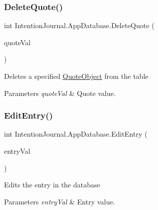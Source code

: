 \subsubsection{\texorpdfstring{Delete\+Quote()}{DeleteQuote()}}
{\footnotesize\ttfamily int Intention\+Journal.\+App\+Database.\+Delete\+Quote (\begin{DoxyParamCaption}\item[{\hyperlink{class_intention_journal_1_1_quote_object}{Quote\+Object}}]{quote\+Val }\end{DoxyParamCaption})\hspace{0.3cm}{\ttfamily [inline]}}



Deletes a specified \hyperlink{class_intention_journal_1_1_quote_object}{Quote\+Object} from the table 


\begin{DoxyParams}{Parameters}
{\em quote\+Val} & Quote value.\\
\hline
\end{DoxyParams}
\mbox{\label{class_intention_journal_1_1_app_database_a07232a4f14f877fc9e46cf57aad2bfae}} 
\subsubsection{\texorpdfstring{Edit\+Entry()}{EditEntry()}}
{\footnotesize\ttfamily int Intention\+Journal.\+App\+Database.\+Edit\+Entry (\begin{DoxyParamCaption}\item[{\hyperlink{class_intention_journal_1_1_entry_object}{Entry\+Object}}]{entry\+Val }\end{DoxyParamCaption})\hspace{0.3cm}{\ttfamily [inline]}}



Edits the entry in the database 


\begin{DoxyParams}{Parameters}
{\em entry\+Val} & Entry value.\\
\hline
\end{DoxyParams}
\mbox{\label{class_intention_journal_1_1_app_database_afc282838226ca74ce6d570132fabea58}} 
